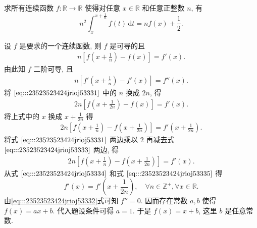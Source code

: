 \documentclass[../../main.tex]{subfiles}%
\begin{document}
\begin{example}
求所有连续函数 \( f : \mathbb{R} \to \mathbb{R} \) 使得对任意 \( x \in \mathbb{R} \) 和任意正整数 \( n \), 有  
\[
n^2 \int_{x}^{x + \frac{1}{n}} f(t) \, \mathrm{d}t = n f(x) + \frac{1}{2}.
\]  
\end{example}
\begin{solution}

设 \( f \) 是要求的一个连续函数, 则 \( f \) 是可导的且  
\begin{align}
n \left[ f \left( x + \frac{1}{n} \right) - f(x) \right] = f'(x). \label{eq:::23523523424jrioj53331}
\end{align}  
由此知 \( f \) 二阶可导, 且  
\begin{align}
n \left[ f' \left( x + \frac{1}{n} \right) - f'(x) \right] = f''(x). \label{eq:::23523523424jrioj53332}
\end{align}  
将 \(\eqref{eq:::23523523424jrioj53331}\) 中的 \( n \) 换成 \( 2n \), 得  
\begin{align}
2n \left[ f \left( x + \frac{1}{2n} \right) - f(x) \right] = f'(x). \label{eq:::23523523424jrioj53333}
\end{align}  
将上式中的 \( x \) 换成 \( x + \frac{1}{2n} \) 得  
\begin{align}
2n \left[ f \left( x + \frac{1}{n} \right) - f \left( x + \frac{1}{2n} \right) \right] = f' \left( x + \frac{1}{2n} \right). \label{eq:::23523523424jrioj53334}
\end{align}  
将式 \(\eqref{eq:::23523523424jrioj53331}\) 两边乘以 \( 2 \) 再减去式 \(\eqref{eq:::23523523424jrioj53333}\) 两边, 得  
\begin{align}
2n \left[ f \left( x + \frac{1}{n} \right) - f \left( x + \frac{1}{2n} \right) \right] = f'(x). \label{eq:::23523523424jrioj53335}
\end{align}  
从式 \(\eqref{eq:::23523523424jrioj53334}\) 和式 \(\eqref{eq:::23523523424jrioj53335}\) 得  
\[
f'(x) = f' \left( x + \frac{1}{2n} \right), \quad \forall n \in \mathbb{Z}^+, \forall x \in \mathbb{R}.
\]  
由\eqref{eq:::23523523424jrioj53332}式可知 \( f'' = 0 \). 因而存在常数 \( a, b \) 使得 \( f(x) = ax + b \). 代入题设条件可得 \( a = 1 \). 于是 \( f(x) = x + b \), 这里 \( b \) 是任意常数.

\end{solution}
\end{document}
